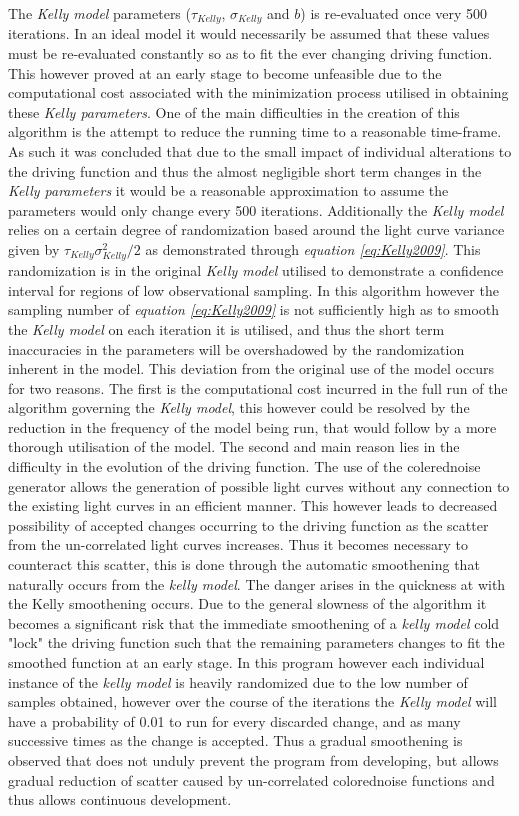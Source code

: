 \documentclass[a4paper, 12pt, twoside]{article}
\begin{document}
The \emph{Kelly model} parameters ($\tau_{Kelly}$, $\sigma_{Kelly}$ and $b$) is re-evaluated once very 500 iterations. In an ideal model it would necessarily be assumed that these values must be re-evaluated constantly so as to fit the ever changing driving function. This however proved at an early stage to become unfeasible due to the computational cost associated with the minimization process utilised in obtaining these \emph{Kelly parameters}. One of the main difficulties in the creation of this algorithm is the attempt to reduce the running time to a reasonable time-frame. As such it was concluded that due to the small impact of individual alterations to the driving function and thus the almost negligible short term changes in the \emph{Kelly parameters} it would be a reasonable approximation to assume the parameters would only change every 500 iterations. Additionally the \emph{Kelly model} relies on a certain degree of randomization based around the light curve variance given by $\tau_{Kelly}\sigma_{Kelly}^{2}/2$ as demonstrated through \emph{equation \ref{eq:Kelly2009}}. This randomization is in the original \emph{Kelly model} utilised to demonstrate a confidence interval for regions of low observational sampling. In this algorithm however the sampling number of \emph{equation \ref{eq:Kelly2009}} is not sufficiently high as to smooth the \emph{Kelly model} on each iteration it is utilised, and thus the short term inaccuracies in the parameters will be overshadowed by the randomization inherent in the model. This deviation from the original use of the model occurs for two reasons. The first is the computational cost incurred in the full run of the algorithm governing the \emph{Kelly model}, this however could be resolved by the reduction in the frequency of the model being run, that would follow by a more thorough utilisation of the model. The second and main reason lies in the difficulty in the evolution of the driving function. The use of the colerednoise generator allows the generation of possible light curves without any connection to the existing light curves in an efficient manner. This however leads to decreased possibility of accepted changes occurring to the driving function as the scatter from the un-correlated light curves increases. Thus it becomes necessary to counteract this scatter, this is done through the automatic smoothening that naturally occurs from the \emph{kelly model}. The danger arises in the quickness at with the Kelly smoothening occurs. Due to the general slowness of the algorithm it becomes a significant risk that the immediate smoothening of a \emph{kelly model} cold "lock" the driving function such that the remaining parameters changes to fit the smoothed function at an early stage. In this program however each individual instance of the \emph{kelly model} is heavily randomized due to the low number of samples obtained, however over the course of the iterations the \emph{Kelly model} will have a probability of 0.01 to run for every discarded change, and as many successive times as the change is accepted. Thus a gradual smoothening is observed that does not unduly prevent the program from developing, but allows gradual reduction of scatter caused by un-correlated colorednoise functions and thus allows continuous development.  \\
\end{document}
